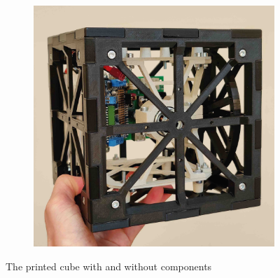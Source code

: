 \begin{figure}[H]
\begin{subfigure}[h]{0.2\textwidth}
        \includegraphics[width=\textwidth]{figures/CubeWithComponents.jpg}
        \label{fig:cubeWith}
    \end{subfigure}
    \caption{The printed cube with and without components}
    \label{fig:AssembledCube}
\end{figure}

